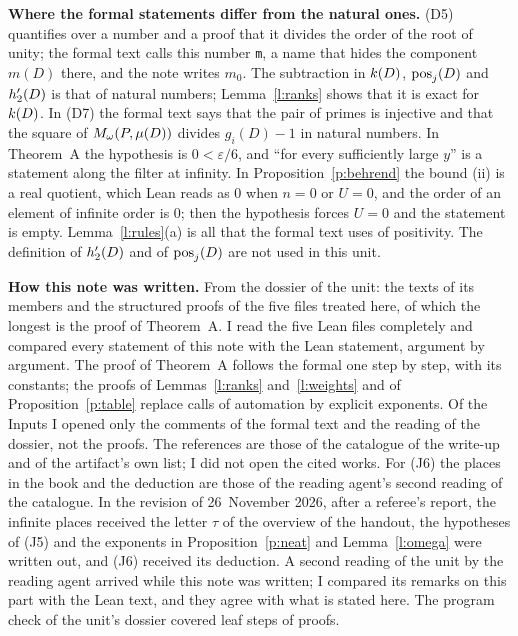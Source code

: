 \documentclass[11pt,a4paper]{article}
\newcommand{\subhead}[1]{\par\addvspace{9pt plus 2pt}\Needspace{4\baselineskip}\noindent\textbf{#1}\enspace\ignorespaces}
\theoremstyle{plainx}
\theoremstyle{uprightx}
\newcommand{\Dm}[1]{m(#1)}
\newcommand{\Dmu}[1]{\mu(#1)}
\newcommand{\Dg}[2]{g_{#1}(#2)}
\begin{document}
\subhead{Where the formal statements differ from the natural ones.} (D5) quantifies over a number and a proof
that it divides the order of the root of unity; the formal text calls this number \texttt{m}, a name that hides the
component $\Dm{D}$ there, and the note writes $m_0$. The subtraction in
$\kD{D}$, $\posD{D}{j}$ and $\rhg{D}$ is that of natural numbers; Lemma~\ref{l:ranks} shows that it is exact for
$\kD{D}$. In (D7) the formal text says that the pair of primes is injective and that the square of
$\Mom{P}{\Dmu{D}}$ divides $\Dg{i}{D}-1$ in natural numbers. In Theorem~A the hypothesis is $0<\varepsilon/6$, and
``for every sufficiently large $y$'' is a statement along the filter at infinity. In
Proposition~\ref{p:behrend} the bound (ii) is a real quotient, which Lean reads as $0$ when $n=0$ or $U=0$, and the
order of an element of infinite order is $0$; then the hypothesis forces $U=0$ and the statement is empty.
Lemma~\ref{l:rules}(a) is all that the formal text uses of positivity. The definition of $\rhg{D}$ and of
$\posD{D}{j}$ are not used in this unit.

\subhead{How this note was written.} From the dossier of the unit: the texts of its members and the structured
proofs of the five files treated here, of which the longest is the proof of Theorem~A. I read the five Lean files
completely and compared every statement of this note with the Lean statement, argument by argument. The proof of
Theorem~A follows the formal one step by step, with its constants; the proofs of Lemmas~\ref{l:ranks}
and~\ref{l:weights} and of Proposition~\ref{p:table} replace calls of automation by explicit exponents. Of the
Inputs I opened only the comments of the formal text and the reading of the dossier, not the proofs. The references
are those of the catalogue of the write-up and of the artifact's own list; I did not open the cited works. For
(J6) the places in the book and the deduction are those of the reading agent's second reading of the catalogue.
In the revision of 26~November 2026, after a referee's report, the infinite places received the letter $\tau$ of
the overview of the handout, the hypotheses of (J5) and the exponents in
Proposition~\ref{p:neat} and Lemma~\ref{l:omega} were written out, and (J6) received its deduction. A second
reading of the unit by the reading agent arrived while this note was written; I compared its remarks on this part
with the Lean text, and they agree with what is stated here. The
program check of the unit's dossier covered \UnitSteps{} leaf steps of \UnitProofs{} proofs.
\end{document}
